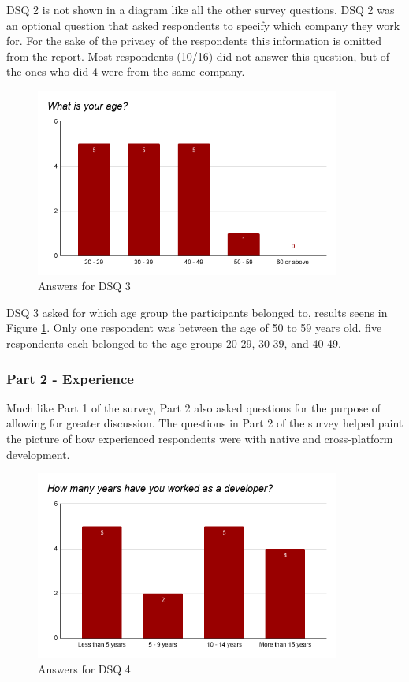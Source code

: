 \documentclass[a4paper,12pt]{article}
\begin{document}
DSQ 2 is not shown in a diagram like all the other survey questions. DSQ 2 was an optional question that asked respondents to specify which company they work for. For the sake of the privacy of the respondents this information is omitted from the report. Most respondents (10/16) did not answer this question, but of the ones who did 4 were from the same company.

\begin{figure}[ht!]
    \centering
    \includegraphics[width=10cm]{img/Results/dsq3.png}
    \caption{Answers for DSQ 3}
    \label{fig:res_devq3}
\end{figure}

DSQ 3 asked for which age group the participants belonged to, results seens in Figure \ref{fig:res_devq3}. Only one respondent was between the age of 50 to 59 years old. five respondents each belonged to the age groups 20-29, 30-39, and 40-49.

\subsubsection{Part 2 - Experience}
\label{Results_dev_part2}
Much like Part 1 of the survey, Part 2 also asked questions for the purpose of allowing for greater discussion. The questions in Part 2 of the survey helped paint the picture of how experienced respondents were with native and cross-platform development.

\begin{figure}[ht!]
    \centering
    \includegraphics[width=10cm]{img/Results/dsq4.png}
    \caption{Answers for DSQ 4}
    \label{fig:res_devq4}
\end{figure}
\end{document}
